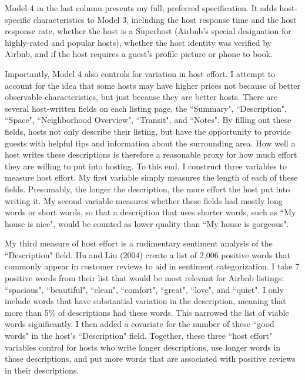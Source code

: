 \documentclass[11pt, oneside]{article}
\begin{document}
Model 4 in the last column presents my full, preferred specification. It adds host-specific characteristics to Model 3, including the host response time and the host response rate, whether the host is a Superhost (Airbnb's special designation for highly-rated and popular hosts), whether the host identity was verified by Airbnb, and if the host requires a guest's profile picture or phone to book. 

Importantly, Model 4 also controls for variation in host effort. I attempt to account for the idea that some hosts may have higher prices not because of better observable characteristics, but just because they are better hosts. There are several host-written fields on each listing page, the ``Summary", ``Description", ``Space", ``Neighborhood Overview", ``Transit", and ``Notes". By filling out these fields, hosts not only describe their listing, but have the opportunity to provide guests with helpful tips and information about the surrounding area. How well a host writes these descriptions is therefore a reasonable proxy for how much effort they are willing to put into hosting. To this end, I construct three variables to measure host effort. My first variable simply measures the length of each of these fields. Presumably, the longer the description, the more effort the host put into writing it. My second variable measures whether these fields had mostly long words or short words, so that a description that uses shorter words, such as ``My house is nice", would be counted as lower quality than ``My house is gorgeous". 

My third measure of host effort is a rudimentary sentiment analysis of the ``Description" field. Hu and Liu (2004) create a list of 2,006 positive words that commonly appear in customer reviews to aid in sentiment categorization.\cite{hu} I take 7 positive words from their list that would be most relevant for Airbnb listings: ``spacious", ``beautiful", ``clean", ``comfort", ``great", ``love", and ``quiet". I only include words that have substantial variation in the description, meaning that more than 5\% of descriptions had these words. This narrowed the list of viable words significantly. I then added a covariate for the number of these ``good words" in the host's ``Description" field. Together, these three ``host effort" variables control for hosts who write longer descriptions, use longer words in those descriptions, and put more words that are associated with positive reviews in their descriptions. 
\end{document}

